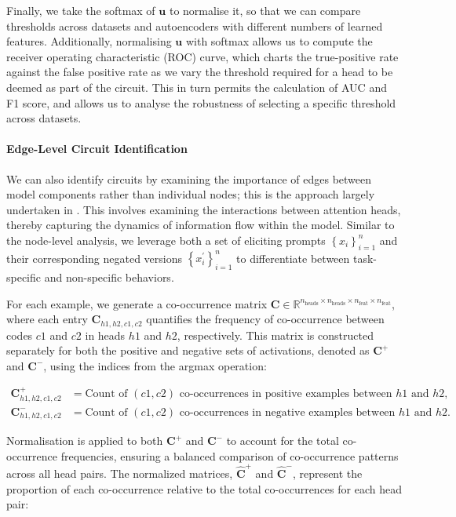 \documentclass[11pt]{scrartcl}
\begin{document}
Finally, we take the softmax of $\mathbf{u}$ to normalise it, so that we can compare thresholds across datasets and autoencoders with different numbers of learned features. Additionally, normalising $\mathbf{u}$ with softmax allows us to compute the receiver operating characteristic (ROC) curve, which charts the true-positive rate against the false positive rate as we vary the threshold required for a head to be deemed as part of the circuit. This in turn permits the calculation of AUC and F1 score, and allows us to analyse the robustness of selecting a specific threshold across datasets.

\paragraph{Edge-Level Circuit Identification}
We can also identify circuits by examining the importance of edges between model components rather than individual nodes; this is the approach largely undertaken in \citet{conmy2024towards}. This involves examining the interactions between attention heads, thereby capturing the dynamics of information flow within the model. Similar to the node-level analysis, we leverage both a set of eliciting prompts $\left\{x_i\right\}_{i=1}^n$ and their corresponding negated versions $\left\{x_i^\prime\right\}_{i=1}^n$ to differentiate between task-specific and non-specific behaviors.

For each example, we generate a co-occurrence matrix $\mathbf{C} \in \mathbb{R}^{n_{\text{heads}} \times n_{\text{heads}} \times n_{\text{feat}} \times n_{\text{feat}}}$, where each entry $\mathbf{C}_{h1,h2,c1,c2}$ quantifies the frequency of co-occurrence between codes $c1$ and $c2$ in heads $h1$ and $h2$, respectively. This matrix is constructed separately for both the positive and negative sets of activations, denoted as $\mathbf{C}^+$ and $\mathbf{C}^-$, using the indices from the argmax operation:

\begin{align*}
\mathbf{C}_{h1,h2,c1,c2}^+ &= \text{Count of }(c1, c2) \text{ co-occurrences in positive examples between } h1 \text{ and } h2, \\
\mathbf{C}_{h1,h2,c1,c2}^- &= \text{Count of }(c1, c2) \text{ co-occurrences in negative examples between } h1 \text{ and } h2.
\end{align*}

Normalisation is applied to both $\mathbf{C}^+$ and $\mathbf{C}^-$ to account for the total co-occurrence frequencies, ensuring a balanced comparison of co-occurrence patterns across all head pairs. The normalized matrices, $\mathbf{\hat{C}}^+$ and $\mathbf{\hat{C}}^-$, represent the proportion of each co-occurrence relative to the total co-occurrences for each head pair:
\end{document}
